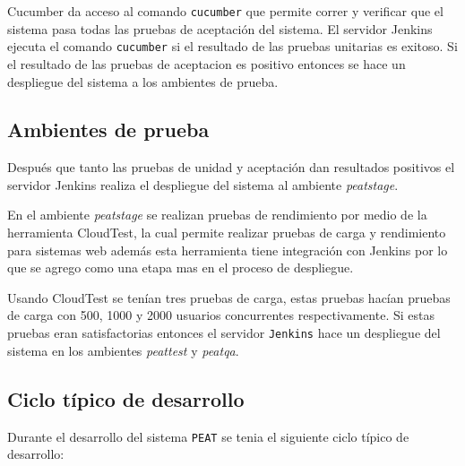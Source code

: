 Cucumber da acceso al comando \texttt{cucumber} que permite correr y verificar
que el sistema pasa todas las pruebas de aceptación del sistema. El servidor
Jenkins ejecuta el comando \texttt{cucumber} si el resultado de las pruebas
unitarias es exitoso. Si el resultado de las pruebas de aceptacion es positivo
entonces se hace un despliegue del sistema a los ambientes de prueba.

\subsection{Ambientes de prueba}

Después que tanto las pruebas de unidad y aceptación dan resultados positivos el
servidor Jenkins realiza el despliegue del sistema al ambiente \textit{peatstage}.

En el ambiente \textit{peatstage} se realizan pruebas de rendimiento por medio
de la herramienta CloudTest, la cual permite realizar pruebas de carga y
rendimiento para sistemas web además esta herramienta tiene integración con
Jenkins por lo que se agrego como una etapa mas en el proceso de despliegue.

Usando CloudTest se tenían tres pruebas de carga, estas pruebas hacían pruebas de
carga con 500, 1000 y 2000 usuarios concurrentes respectivamente. Si estas pruebas
eran satisfactorias entonces el servidor \texttt{Jenkins} hace un despliegue del
sistema en los ambientes \textit{peattest} y \textit{peatqa}.

\subsection{Ciclo típico de desarrollo}

Durante el desarrollo del sistema \texttt{PEAT} se tenia el siguiente ciclo
típico de desarrollo:

